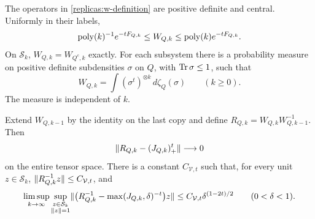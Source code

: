 \begin{lemma}\label{replicas:metric}
The operators in \eqref{replicas:w-definition} are positive definite
and central.  Uniformly in their labels,
\begin{equation}\label{replicas:W-comparison}
 \operatorname{poly}(k)^{-1}e^{-tF_{Q,k}}\le W_{Q,k}
       \le\operatorname{poly}(k)e^{-tF_{Q,k}}.
\end{equation}
On $\mathcal S_k$, $W_{Q,k}=W_{Q^c,k}$ exactly.  For each subsystem
there is a probability measure on positive definite subdensities
$\sigma$ on $Q$, with $\operatorname{Tr}\sigma\le1$, such that
\begin{equation}\label{replicas:W-integral}
 W_{Q,k}=\int(\sigma^t)^{\otimes k}\,d\zeta_Q(\sigma)
                  \qquad(k\ge0).
\end{equation}
The measure is independent of $k$.

Extend $W_{Q,k-1}$ by the identity on the last copy and define
$R_{Q,k}=W_{Q,k}W_{Q,k-1}^{-1}$.  Then
\begin{equation}\label{replicas:R-forward}
 \lVert R_{Q,k}-(J_{Q,k})_+^t\rVert\longrightarrow0
\end{equation}
on the entire tensor space.  There is a constant $C_{\mathcal V,t}$
such that, for every unit $z\in\mathcal S_k$,
$\lVert R_{Q,k}^{-1}z\rVert\le C_{\mathcal V,t}$, and
\begin{equation}\label{replicas:R-inverse}
 \limsup_{k\to\infty}\sup_{\substack{z\in\mathcal S_k\\\lVert z\rVert=1}}
 \lVert \bigl(R_{Q,k}^{-1}-\max(J_{Q,k},\delta)^{-t}\bigr)z\rVert
 \le C_{\mathcal V,t}\delta^{(1-2t)/2}
                 \qquad(0<\delta<1).
\end{equation}
\end{lemma}

